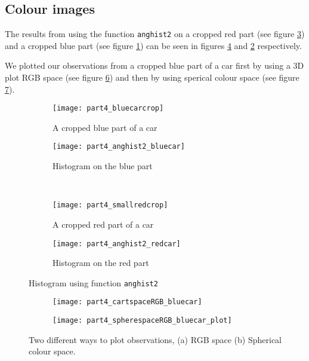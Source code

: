 \subsection{Colour images}
The results from using the function \texttt{anghist2} on a cropped red part (see figure \ref{fig:redCrop}) and a cropped blue part (see figure \ref{fig:blueCrop}) can be seen in figures \ref{fig:redSpec} and \ref{fig:blueSpec} respectively.

We plotted our observations from a cropped blue part of a car first by using a 3D plot RGB space (see figure \ref{fig:cartSpace}) and then by using sperical colour space (see figure \ref{fig:sphereSpace}).
\begin{figure}
	\centering
	\begin{subfigure}[b]{0.4\textwidth}
		\texttt{[image: part4\_bluecarcrop]}
		\caption{A cropped blue part of a car}
		\label{fig:blueCrop}
	\end{subfigure}
	\begin{subfigure}[b]{0.4\textwidth}
		\texttt{[image: part4\_anghist2\_bluecar]}
		\caption{Histogram on the blue part}
		\label{fig:blueSpec}
	\end{subfigure}
	\\
	\begin{subfigure}[b]{0.4\textwidth}
		\texttt{[image: part4\_smallredcrop]}
		\caption{A cropped red part of a car}
		\label{fig:redCrop}
	\end{subfigure}
	\begin{subfigure}[b]{0.4\textwidth}
		\texttt{[image: part4\_anghist2\_redcar]}
		\caption{Histogram on the red part}
		\label{fig:redSpec}
	\end{subfigure}
	\caption{Histogram using function \texttt{anghist2}}
	\label{fig:colour}
\end{figure}
\begin{figure}

	\centering
	\begin{subfigure}[b]{0.4\textwidth}
		\texttt{[image: part4\_cartspaceRGB\_bluecar]}
		\caption{}
		\label{fig:cartSpace}
	\end{subfigure}
	\begin{subfigure}[b]{0.4\textwidth}	
		\texttt{[image: part4\_spherespaceRGB\_bluecar\_plot]}
		\caption{}
		\label{fig:sphereSpace}
	\end{subfigure}
	\caption{Two different ways to plot observations, (a) RGB space (b) Spherical colour space. }
	\label{fig:part4Sphere}
\end{figure}

